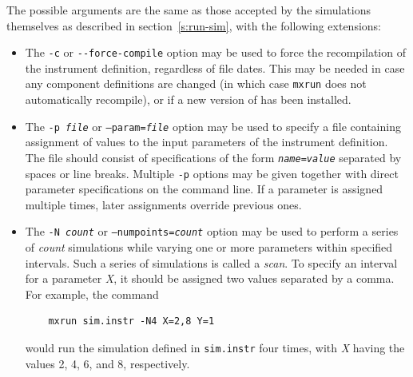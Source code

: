 The possible arguments are the same as those accepted by the simulations
themselves as described in section~\ref{s:run-sim}, with the following
extensions:
\begin{itemize}
\item The \verb+-c+ or \verb+--force-compile+ option may be used to force
  the recompilation of the instrument definition, regardless of file
  dates. This may be needed in case any component definitions are
  changed (in which case \verb+mxrun+ does not automatically recompile),
  or if a new version of \MCX  has been installed.
\item The \texttt{-p \textit{file}} or \texttt{--param=\textit{file}} option
  may be used to specify a file containing assignment of values to the
  input parameters of the instrument definition. The file should consist
  of specifications of the form \texttt{\textit{name\/}=\textit{value\/}}
  separated by spaces or line breaks. Multiple \verb+-p+ options may be
  given together with direct parameter specifications on the command
  line. If a parameter is assigned multiple times, later assignments
  override previous ones.
\item The \texttt{-N \textit{count}} or \texttt{--numpoints=\textit{count}} option
  may be used to perform a series of \textit{count\/} simulations while
  varying one or more parameters within specified intervals. Such a
  series of simulations is called a \emph{scan}. To specify
  an interval for a parameter \textit{X}, it should be assigned two
  values separated by a comma. For example, the command
\begin{verbatim}
    mxrun sim.instr -N4 X=2,8 Y=1
\end{verbatim}
would run the simulation defined in \verb+sim.instr+ four times, with
\textit{X} having the values 2, 4, 6, and 8, respectively.


\end{itemize}
